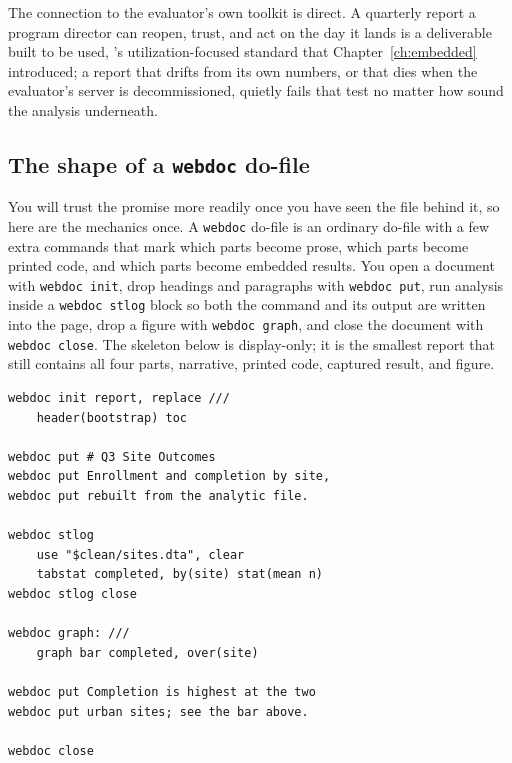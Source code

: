 The connection to the evaluator's own toolkit is direct. A quarterly report a program director can reopen, trust, and act on the day it lands is a deliverable built to be used, \textcite{patton2008utilization}'s utilization-focused standard that Chapter~\ref{ch:embedded} introduced; a report that drifts from its own numbers, or that dies when the evaluator's server is decommissioned, quietly fails that test no matter how sound the analysis underneath.

\subsection{The shape of a \texttt{webdoc} do-file}
You will trust the promise more readily once you have seen the file behind it, so here are the mechanics once. A \texttt{webdoc} do-file is an ordinary do-file with a few extra commands that mark which parts become prose, which parts become printed code, and which parts become embedded results. You open a document with \texttt{webdoc init}, drop headings and paragraphs with \texttt{webdoc put}, run analysis inside a \texttt{webdoc stlog} block so both the command and its output are written into the page, drop a figure with \texttt{webdoc graph}, and close the document with \texttt{webdoc close}. The skeleton below is display-only; it is the smallest report that still contains all four parts, narrative, printed code, captured result, and figure.
\par
{\footnotesize
\begin{verbatim}
webdoc init report, replace ///
    header(bootstrap) toc

webdoc put # Q3 Site Outcomes
webdoc put Enrollment and completion by site,
webdoc put rebuilt from the analytic file.

webdoc stlog
    use "$clean/sites.dta", clear
    tabstat completed, by(site) stat(mean n)
webdoc stlog close

webdoc graph: ///
    graph bar completed, over(site)

webdoc put Completion is highest at the two
webdoc put urban sites; see the bar above.

webdoc close
\end{verbatim}
}
